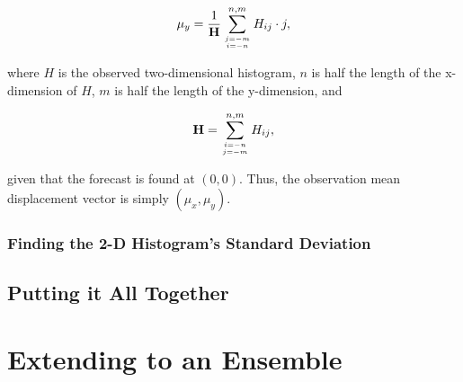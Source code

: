     \begin{equation}
        \label{muy}
        \mu_y = \frac{1}{\mathbf{H}} \sum\limits_{j=-m \atop i=-n}^{n,m}H_{ij} \cdot j,
    \end{equation}

\noindent where $H$ is the observed two-dimensional histogram, $n$ is half the length of the x-dimension of $H$, $m$ is half the length of the y-dimension, and

    \begin{equation}
        \mathbf{H} = \sum\limits_{i=-n \atop j=-m}^{n,m} H_{ij},
    \end{equation}

\noindent given that the forecast is found at $(0, 0)$. Thus, the observation mean displacement vector is simply $(\mu_x, \mu_y)$.




\subsubsection{Finding the 2-D Histogram's Standard Deviation}
\label{std}




\subsection{Putting it All Together}
\label{kde}




\section{Extending to an Ensemble}
\label{emethod}
